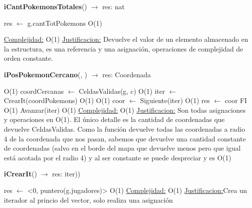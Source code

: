 \begin{Algoritmos}
\begin{algorithm}[H]{\textbf{iCantPokemonsTotales}() $\to$ res: nat}
\begin{algorithmic}[1]
		\State res $\gets$ g.cantTotPokemons \Comment O(1)
		
		\medskip
		\Statex \underline{Complejidad:} O(1)
		\Statex \underline{Justificacion:} Devuelve el valor de un elemento almacenado en la estructura, es una referencia y una asignación, operaciones de complejidad de orden constante.
	\end{algorithmic}
\end{algorithm}

\begin{algorithm}[H]{\textbf{iPosPokemonCercano}(, ) $\to$ res: Coordenada}
	\begin{algorithmic}[1]
		
		 \Comment O(1)
			\State coordCercanas $\gets$ CeldasValidas(g, c) \Comment O(1)
			\State iter $\gets$ CrearIt(coordPokemons) \Comment O(1)
			 \Comment O(1)
				\State coor $\gets$ Siguiente(iter) \Comment O(1)
					\State res $\gets$ coor FI \Comment O(1)
				\EndIf				
				\State Avanzar(iter) \Comment O(1)
			\EndWhile
		\EndIf
		\medskip
		\Statex \underline{Complejidad:} O(1)
		\Statex \underline{Justificacion:} Son todas asignaciones y operaciones en O(1). El \'unico detalle es la cantidad de coordenadas que devuelve CeldasValidas. Como la funci\'on devuelve todas las coordenadas a radio 4 de la coordenada que nos pasan, sabemos que devuelve una cantidad constante de coordenadas (salvo en el borde del mapa que devuelve menos pero que igual est\'a acotada por el radio 4) y al ser constante se puede despreciar y es O(1)
	\end{algorithmic}
\end{algorithm}




\begin{algorithm}[H]{\textbf{iCrearIt}() $\to$ res: iter))}
	\begin{algorithmic}[1]
		\State res $\gets$ <0, puntero(g.jugadores)> \Comment O(1)
		\medskip
		\Statex \underline{Complejidad:} O(1)
		\Statex \underline{Justificacion:}Crea un iterador al princio del vector, solo 
		realiza una asignación  
	\end{algorithmic}
\end{algorithm}


\end{Algoritmos}
